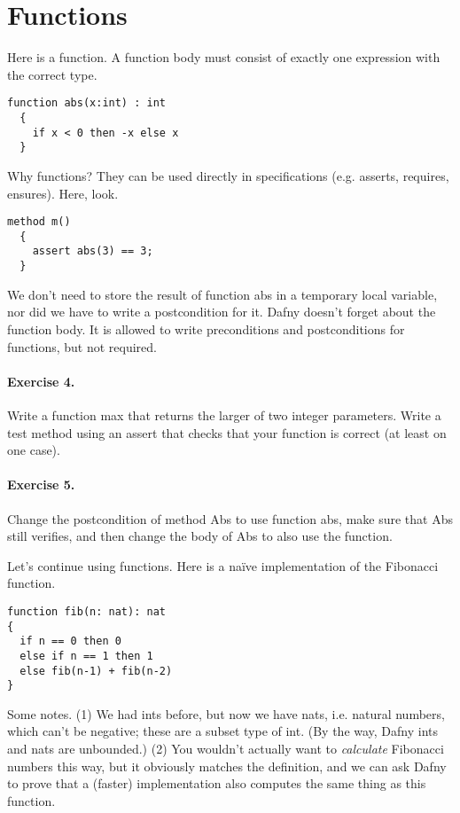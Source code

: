 \documentclass[11pt]{article}
\begin{document}

\section*{Functions}

Here is a function. A function body must consist of exactly one expression with the correct type.
\begin{lstlisting}[language=dafny]
  function abs(x:int) : int
  {
    if x < 0 then -x else x
  }
\end{lstlisting}

Why functions? They can be used directly in specifications (e.g. asserts, requires, ensures). Here, look.
\begin{lstlisting}[language=dafny]
  method m()
  {
    assert abs(3) == 3;
  }
\end{lstlisting}
We don't need to store the result of function \textsf{abs} in a temporary local variable, nor did we have
to write a postcondition for it. Dafny doesn't forget about the function body. It is allowed to write
preconditions and postconditions for functions, but not required.

\paragraph{Exercise 4.} Write a function \textsf{max} that returns the larger of two integer parameters.
Write a test method using an \textsf{assert} that checks that your function is correct (at least on one
case).

\paragraph{Exercise 5.} Change the postcondition of method \textsf{Abs} to use function \textsf{abs}, make sure
that \textsf{Abs} still verifies, and then change the body of \textsf{Abs} to also use the function.

Let's continue using functions. Here is a na\"ive implementation of the Fibonacci function.

\begin{lstlisting}[language=dafny]
function fib(n: nat): nat
{
  if n == 0 then 0
  else if n == 1 then 1
  else fib(n-1) + fib(n-2)
}
\end{lstlisting}

Some notes. (1) We had \textsf{int}s before, but now we have
\textsf{nat}s, i.e. natural numbers, which can't be negative; these
are a subset type of \textsf{int}. (By the way, Dafny \textsf{int}s
and \textsf{nat}s are unbounded.) (2) You wouldn't actually want to
\emph{calculate} Fibonacci numbers this way, but it obviously matches
the definition, and we can ask Dafny to prove that a (faster) implementation
also computes the same thing as this function.
\end{document}
